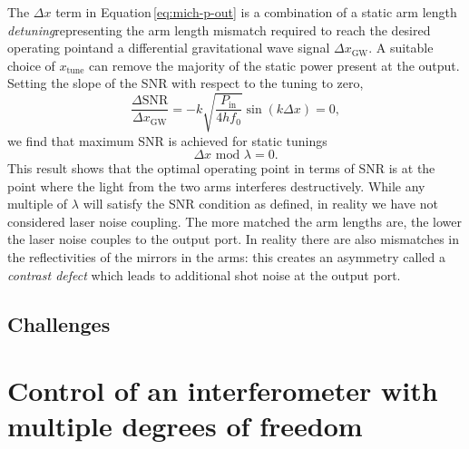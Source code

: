 The $\Delta x$ term in Equation\,\ref{eq:mich-p-out} is a combination of a static arm length \emph{detuning}\textemdash representing the arm length mismatch required to reach the desired operating point\textemdash and a differential gravitational wave signal $\Delta x_{\text{GW}}$. A suitable choice of $ x_{\text{tune}}$ can remove the majority of the static power present at the output. Setting the slope of the SNR with respect to the tuning to zero,
\begin{equation}
  \frac{\Delta \text{SNR}}{\Delta x_{\text{GW}}} = -k \sqrt{\frac{P_{\text{in}}}{4 h f_0}} \sin \left(k \Delta x\right) = 0,
\end{equation}
we find that maximum SNR is achieved for static tunings 
\begin{equation}
  \Delta x \text{ mod } \lambda = 0.
\end{equation}
This result shows that the optimal operating point in terms of SNR is at the point where the light from the two arms interferes destructively. While any multiple of $\lambda$ will satisfy the SNR condition as defined, in reality we have not considered laser noise coupling. The more matched the arm lengths are, the lower the laser noise couples to the output port. In reality there are also mismatches in the reflectivities of the mirrors in the arms: this creates an asymmetry called a \emph{contrast defect} which leads to additional shot noise at the output port.



\subsection{Challenges}


\section{Control of an interferometer with multiple degrees of freedom}

